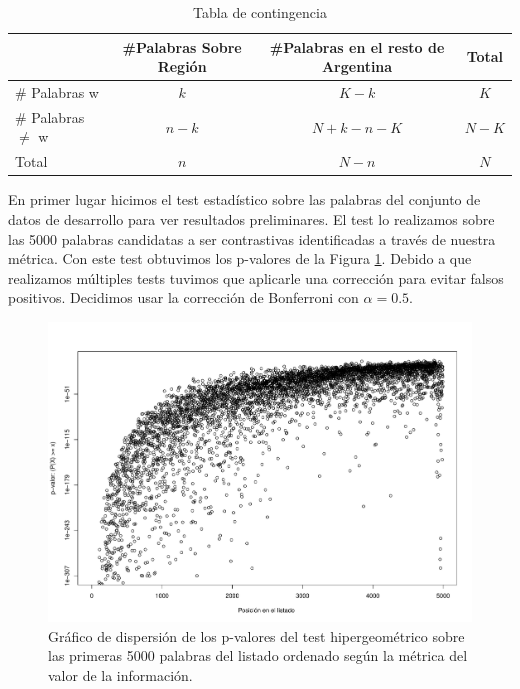 \begin{table}[ht]
\centering
\begin{tabular}{l|ccc}
\hline
& \#Palabras Sobre Región &\#Palabras en el resto de Argentina &Total \\ \hline
\# Palabras w &   $k$ & $K-k$ & $K$ \\ 
\# Palabras $\neq$ w & $n-k$ & $N + k - n - K$  & $N - K$ \\ \hline
Total & $n$ & $N -n$ & $N$ \\ 
\end{tabular}
\caption{Tabla de contingencia}
\label{tab:contingencia}
\end{table}



En primer lugar hicimos el test estadístico sobre las palabras del conjunto de datos de desarrollo para ver resultados preliminares. El test lo realizamos sobre las 5000 palabras candidatas a ser contrastivas identificadas a través de nuestra métrica. Con este test obtuvimos los p-valores de la Figura \ref{fig:p-valores}. Debido a que realizamos múltiples tests tuvimos que aplicarle una corrección para evitar falsos positivos. Decidimos usar la corrección de Bonferroni con $\alpha = 0.5$.

\begin{figure}[!ht]\centering
    \includegraphics[width=\linewidth]{images/pvaloresHipergeometrico.pdf}
    \caption{Gráfico de dispersión de los p-valores del test hipergeométrico sobre las primeras 5000 palabras del listado ordenado según la métrica del valor de la información.} 
    \label{fig:p-valores}   
\end{figure}


